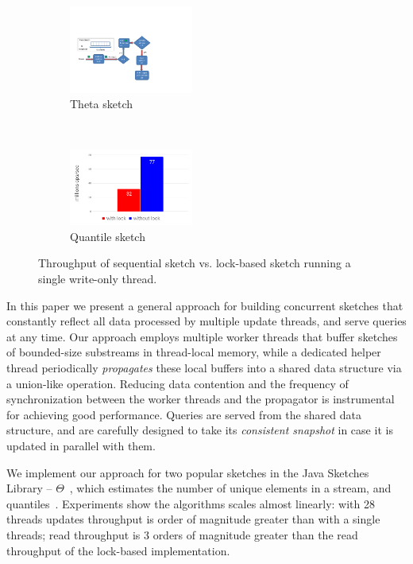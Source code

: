 \begin{figure}[t!]
    \centering
    \begin{subfigure}[t]{0.25\textwidth}
        \centering
        \includegraphics[width=1.6in]{images/seqTheta}
        \caption{Theta sketch}
        \label{fig:LockIsBadTheta}
    \end{subfigure}%
    ~ 
    \begin{subfigure}[t]{0.25\textwidth}
        \centering
        \includegraphics[width=1.6in]{images/seqQuantiles}
        \caption{Quantile sketch}
        \label{fig:LockIsBadQuantiles}
    \end{subfigure}
    \caption{Throughput of sequential sketch vs. lock-based sketch running a single write-only thread.}
    \label{fig:lockBased}
\end{figure}



In this paper 
we present a general approach for building concurrent sketches that
constantly reflect all data processed by multiple update threads, 
and serve queries at any time. %
Our  approach employs multiple worker threads that buffer sketches of bounded-size substreams in thread-local memory, while a dedicated helper thread 
periodically \emph{propagates} these local buffers into a shared data structure via a union-like operation.
 Reducing data contention and the frequency of synchronization between the worker threads and the propagator is instrumental for achieving good performance. Queries are served from the shared data structure, and are carefully 
 designed to take its \emph{consistent snapshot} in case it is updated in parallel with them.

We implement our approach for two popular sketches in the Java Sketches Library -- $\Theta$~\cite{Theta},
which estimates the number of unique elements in a stream, and quantiles~\cite{quantiles}.
Experiments show the algorithms scales almost linearly: with 28 threads updates throughput is order of magnitude greater than with a single threads; 
read throughput is 3 orders of magnitude greater than the read throughput of the lock-based implementation.  


 
